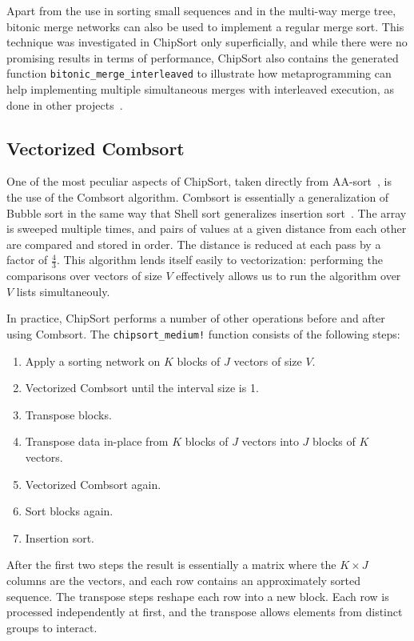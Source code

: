 \documentclass{juliacon}
\begin{document}
Apart from the use in sorting small sequences and in the multi-way merge tree, bitonic merge networks can also be used to implement a regular merge sort. This technique was investigated in ChipSort only superficially, and while there were no promising results in terms of performance, ChipSort also contains the generated function {\tt bitonic\_merge\_interleaved} to illustrate how metaprogramming can help implementing multiple simultaneous merges with interleaved execution, as done in other projects~\cite{DBLP:journals/pvldb/ChhuganiNLMHCBKD08}.

\subsection{Vectorized Combsort}
%
One of the most peculiar aspects of ChipSort, taken directly from AA-sort~\cite{DBLP:conf/IEEEpact/InoueMKN07,DBLP:journals/pvldb/InoueT15}, is the use of the Combsort algorithm. Combsort is essentially a generalization of Bubble sort in the same way that Shell sort generalizes insertion sort~\cite{dobosiewicz1980efficient,Lacey:1991:FES:117187.117218,DBLP:books/lib/Knuth98a,DBLP:books/daglib/0023376}. The array is sweeped multiple times, and pairs of values at a given distance from each other are compared and stored in order. The distance is reduced at each pass by a factor of $\frac{4}{3}$. This algorithm lends itself easily to vectorization: performing the comparisons over vectors of size $V$ effectively allows us to run the algorithm over $V$ lists simultaneouly.

In practice, ChipSort performs a number of other operations before and after using Combsort. The {\tt chipsort\_medium!} function consists of the following steps:

\begin{enumerate}
\item Apply a sorting network on $K$ blocks of $J$ vectors of size $V$.
\item Vectorized Combsort until the interval size is 1.
\item Transpose blocks.
\item Transpose data in-place from $K$ blocks of $J$ vectors into $J$ blocks of $K$ vectors.
\item Vectorized Combsort again.
\item Sort blocks again.
\item Insertion sort.
\end{enumerate}

After the first two steps the result is essentially a matrix where the $K\times J$ columns are the vectors, and each row contains an approximately sorted sequence. The transpose steps reshape each row into a new block. Each row is processed independently at first, and the transpose allows elements from distinct groups to interact.
\end{document}
